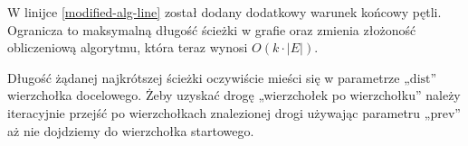 \documentclass[14pt]{article}
\begin{document}
W linijce \ref{modified-alg-line} został dodany dodatkowy warunek końcowy pętli. Ogranicza to maksymalną długość ścieżki w grafie oraz zmienia złożoność obliczeniową algorytmu, która teraz wynosi $O(k\cdot |E|)$.

Długość żądanej najkrótszej ścieżki oczywiście mieści się w parametrze „$\mathrm{dist}$” wierzchołka docelowego.
Żeby uzyskać drogę „wierzchołek po wierzchołku” należy iteracyjnie przejść po wierzchołkach znalezionej drogi używając parametru „$\mathrm{prev}$” aż nie dojdziemy do wierzchołka startowego.
\end{document}
